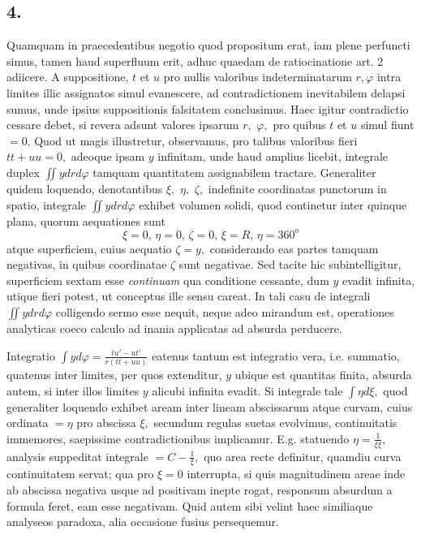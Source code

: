 \documentclass[14pt]{memoir}
\theoremstyle{plain}
\theoremstyle{remark}
\begin{document}
\subsection*{4.} 
Quamquam in praecedentibus negotio quod propositum erat, iam plene perfuncti simus, tamen haud superfluum erit, adhuc quaedam de ratiocinatione art. 2 
adiicere. A suppositione, \(t\) et \(u\) pro nullis valoribus indeterminatarum \(r, \varphi\) intra limites illic assignatos simul evanescere, ad contradictionem inevitabilem delapsi sumus, unde ipsius suppositionis falsitatem conclusimus. Haec igitur contradictio cessare debet, si revera adsunt valores ipsarum \(r,\) \(\varphi,\) pro quibus \(t\) et \(u\) simul fiunt \(=0.\) Quod ut magis illustretur, observamus, pro talibus valoribus fieri \(tt+uu=0,\) adeoque ipsam \(y\) infinitam, unde haud amplius licebit, integrale duplex \(\iint y drd\varphi\) tamquam quantitatem assignabilem tractare. Generaliter quidem loquendo, denotantibus \(\xi,\) \(\eta,\) \(\zeta,\) indefinite coordinatas punctorum in spatio, integrale \(\iint ydrd\varphi\) exhibet volumen solidi, quod continetur inter quinque plana, quorum aequationes sunt 
\[ \xi=0\text{, }\eta=0\text{, }\zeta=0\text{, }\xi=R\text{, }\eta=360^o \]
atque superficiem, cuius aequatio \(\zeta=y,\) considerando eas partes tamquam negativas, in quibus coordinatae \(\zeta\) sunt negativae. Sed tacite hic subintelligitur, superficiem sextam esse \textit{continuam} qua conditione cessante, dum \(y\) evadit infinita, utique fieri potest, ut conceptus ille sensu careat. In tali casu de integrali \(\iint y drd\varphi\) colligendo sermo esse nequit, neque adeo mirandum est, operationes analyticas coeco calculo ad inania applicatas ad absurda perducere.

Integratio \(\displaystyle \int y d\varphi = \tfrac{tu'-ut'}{r(tt+uu)} \) eatenus tantum est integratio vera, i.e. summatio, quatenus inter limites, per quos extenditur, \(y\) ubique est quantitas finita, absurda autem, si inter illos limites \(y\) alicubi infinita evadit. Si integrale tale \(\displaystyle \int \eta d\xi,\) quod generaliter loquendo exhibet aream inter lineam abscissarum atque curvam, cuius ordinata \(=\eta\) pro abscissa \(\xi,\) secundum regulas suetas evolvimus, continuitatis immemores, saepissime contradictionibus implicamur. E.g. statuendo 
\(\eta = \frac{1}{\xi\xi},\) analysis suppeditat integrale \(= C-\frac{1}{\xi},\) quo area recte definitur, quamdiu curva continuitatem servat; qua pro \(\xi =0\) interrupta, si quis magnitudinem areae inde ab abscissa negativa usque ad positivam inepte rogat, responsum absurdum a formula feret, eam esse negativam. Quid autem sibi velint haec similiaque analyseos paradoxa, alia occasione fusius persequemur. 
\end{document}
